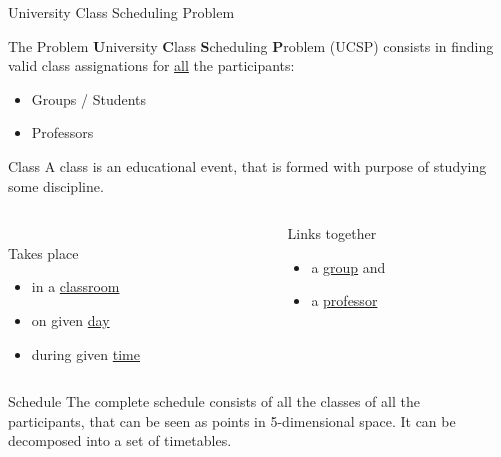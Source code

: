 \documentclass{beamer}
\providecommand{\rootdir}{../doc}
\begin{document}
\begin{frame}{University Class Scheduling Problem}
  \begin{block}{The Problem}
    \textbf{U}niversity \textbf{C}lass \textbf{S}cheduling \textbf{P}roblem (UCSP)
    consists in finding valid \alert{class} assignations for \underline{all} the
    participants:
    \begin{itemize}
      \item Groups / Students
      \item Professors
    \end{itemize}
  \end{block}
  \begin{block}{Class}
    A class is an educational event, that is formed with purpose of studying
    some \alert{discipline}.
    \begin{columns}
      \begin{column}{4cm}
        \\Takes place
        \begin{itemize}
          \item in a \underline{classroom}
          \item on given \underline{day}
          \item during given \underline{time}
        \end{itemize}
      \end{column}
      \begin{column}{3cm}
        Links together
        \begin{itemize}
          \item a \underline{group} and
          \item a \underline{professor}
        \end{itemize}
      \end{column}
    \end{columns}

  \end{block}
\end{frame}

\begin{frame}
  \begin{columns}
    \begin{column}{4cm}
      \begin{block}{Schedule}
        The complete schedule consists of all the classes of all the participants,
        that can be seen as points in 5-dimensional space. It can be decomposed
        into a set of \alert{timetables}.
      \end{block}
    \end{column}
    \begin{column}{7cm}
      \resizebox{\textwidth}{!}{
        
        }
    \end{column}
  \end{columns}
\end{frame}
\end{document}

